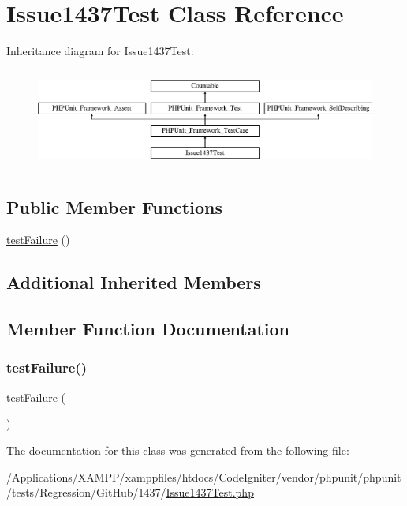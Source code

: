 \hypertarget{class_issue1437_test}{}\section{Issue1437\+Test Class Reference}
\label{class_issue1437_test}
Inheritance diagram for Issue1437\+Test\+:\begin{figure}[H]
\begin{center}
\leavevmode
\includegraphics[height=3.303835cm]{class_issue1437_test}
\end{center}
\end{figure}
\subsection*{Public Member Functions}
\begin{DoxyCompactItemize}
\item 
\mbox{\hyperlink{class_issue1437_test_ab4995640dd47ccdf177deb72344da9e0}{test\+Failure}} ()
\end{DoxyCompactItemize}
\subsection*{Additional Inherited Members}


\subsection{Member Function Documentation}
\mbox{\label{class_issue1437_test_ab4995640dd47ccdf177deb72344da9e0}} 
\subsubsection{\texorpdfstring{test\+Failure()}{testFailure()}}
{\footnotesize\ttfamily test\+Failure (\begin{DoxyParamCaption}{ }\end{DoxyParamCaption})}



The documentation for this class was generated from the following file\+:\begin{DoxyCompactItemize}
\item 
/\+Applications/\+X\+A\+M\+P\+P/xamppfiles/htdocs/\+Code\+Igniter/vendor/phpunit/phpunit/tests/\+Regression/\+Git\+Hub/1437/\mbox{\hyperlink{_issue1437_test_8php}{Issue1437\+Test.\+php}}\end{DoxyCompactItemize}
